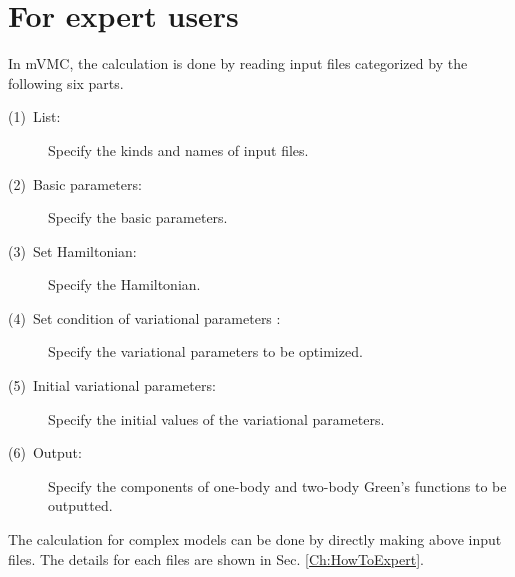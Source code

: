 \section{For expert users}
In mVMC, the calculation is done by reading input files categorized by the following six parts. 
\begin{description}
\item[(1)~List:] Specify the kinds and names of input files. 
\item[(2)~Basic parameters:] Specify the basic parameters.
\item[(3)~Set Hamiltonian:] Specify the Hamiltonian.
\item[(4)~Set condition of variational parameters :] Specify the variational parameters to be optimized.
\item[(5)~Initial variational parameters:] Specify the initial values of the variational parameters.
\item[(6)~Output:] Specify the components of one-body and two-body Green's functions to be outputted.
\end{description}

The calculation for complex models can be done by directly making above input files. 
The details for each files are shown in Sec. \ref{Ch:HowToExpert}.
